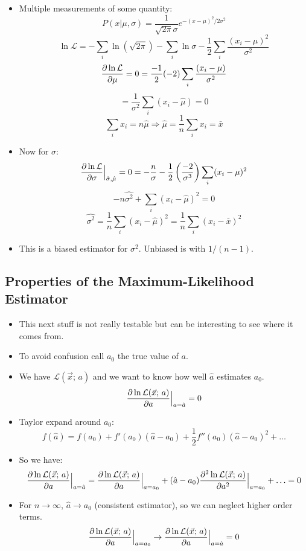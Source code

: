 \begin{itemize}
      \item Multiple measurements of some quantity:
            \[ P(x | \mu, \sigma) = \frac{1}{\sqrt{2 \pi} \sigma} e^{-(x - \mu)^2 / 2 \sigma^2} \]
            \[ \ln \mathcal{L} = - \sum_i \ln (\sqrt{2 \pi}) - \sum_i \ln \sigma - \frac{1}{2} \sum_i \frac{(x_i - \mu)^2}{\sigma^2} \]
            \[ \pdv{\ln \mathcal{L}}{\mu} = 0 = \frac{-1}{2} (-2) \sum_i \frac{(x_i - \mu)}{\sigma^2} \]
            \[ = \frac{1}{\sigma^2}  \sum_i (x_i - \hat{\mu}) = 0 \]
            \[ \sum_i x_i = n \hat{\mu} \Rightarrow \hat{\mu} = \frac{1}{n} \sum_i x_i = \bar{x} \]
      \item Now for $\sigma$:
            \[ \pdv{\ln \mathcal{L}}{\sigma}\Big|_{\hat{\sigma}, \hat{\mu}} = 0 = -\frac{n}{\sigma}- \frac{1}{2} \left(\frac{-2}{\sigma^3} \right) \sum_i (x_i - \mu)^2 \]
            \[ -n \hat{\sigma^2} + \sum_i (x_i - \hat{\mu})^2 = 0 \]
            \[ \hat{\sigma^2} = \frac{1}{n} \sum_i (x_i - \hat{\mu})^2  = \frac{1}{n} \sum_i (x_i - \bar{x})^2 \]
      \item This is a biased estimator for $\sigma^2$. Unbiased is with $1/(n-1)$.
\end{itemize}

\subsection{Properties of the Maximum-Likelihood Estimator}

\begin{itemize}
      \item This next stuff is not really testable but can be interesting to see where it comes from.
      \item To avoid confusion call $a_0$ the true value of $a$.
      \item We have $\mathcal{L}(\vec{x}; \, a)$ and we want to know how well $\hat{a}$ estimates $a_0$.
            \[ \pdv{\ln \mathcal{L}(\vec{x}; \, a)}{a} \Big|_{a = \hat{a}} = 0 \]
      \item Taylor expand around $a_0$:
            \[ f(\hat{a}) = f(a_0) + f'(a_0) (\hat{a} - a_0) + \frac{1}{2} f''(a_0) (\hat{a} - a_0)^2 + \ldots \]
      \item So we have:
            \[ \pdv{\ln \mathcal{L}(\vec{x}; \, a)}{a} \Big|_{a = \hat{a}} = \pdv{\ln \mathcal{L}(\vec{x}; \, a)}{a} \Big|_{a = a_0} + (\hat{a} - a_0) \pdv[2]{\ln \mathcal{L}(\vec{x}; \, a)}{a} \Big|_{a = a_0} + \ldots = 0 \]
      \item For $n\rightarrow \infty$, $\hat{a} \rightarrow a_0$ (consistent estimator), so we can neglect higher order terms.
            \[ \pdv{\ln \mathcal{L}(\vec{x}; \, a)}{a} \Big|_{a = a_0} \rightarrow \pdv{\ln \mathcal{L}(\vec{x}; \, a)}{a} \Big|_{a = \hat{a}} = 0 \]
\end{itemize}

